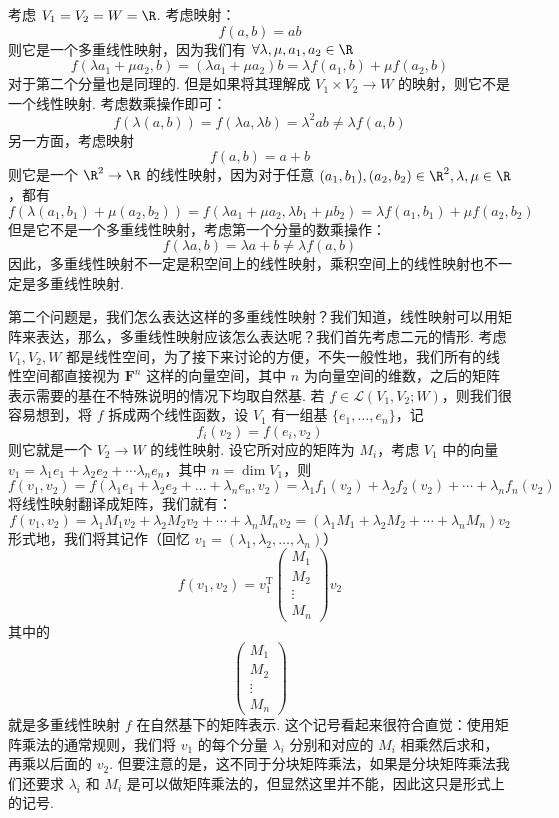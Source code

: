 \begin{example}{}{}
    考虑 $V_1 = V_2 = W = \R$. 考虑映射：
    \[
    f(a, b) = ab
    \]
    则它是一个多重线性映射，因为我们有 $\forall \lambda, \mu, a_1, a_2 \in \R$
    \[
    f(\lambda a_1 + \mu a_2, b) = (\lambda a_1 + \mu a_2) b = \lambda f(a_1, b) + \mu f(a_2, b)
    \]
    对于第二个分量也是同理的. 但是如果将其理解成 $V_1 \times V_2 \to W$ 的映射，则它不是一个线性映射. 考虑数乘操作即可：
    \[
    f(\lambda (a, b)) = f(\lambda a, \lambda b) = \lambda^2 ab \neq \lambda f(a, b)
    \]
    另一方面，考虑映射
    \[
    f(a, b) = a + b
    \]
    则它是一个 $\R^2 \to \R$ 的线性映射，因为对于任意 $(a_1, b_1), (a_2, b_2) \in \R^2, \lambda, \mu \in \R$，都有
    \[
    f(\lambda (a_1, b_1) + \mu (a_2, b_2)) = f(\lambda a_1 + \mu a_2, \lambda b_1 + \mu b_2) = \lambda f(a_1, b_1) + \mu f(a_2, b_2)
    \]
    但是它不是一个多重线性映射，考虑第一个分量的数乘操作：
    \[
    f(\lambda a, b) = \lambda a + b \neq \lambda f(a, b)
    \]
    因此，多重线性映射不一定是积空间上的线性映射，乘积空间上的线性映射也不一定是多重线性映射.
\end{example}

第二个问题是，我们怎么表达这样的多重线性映射？我们知道，线性映射可以用矩阵来表达，那么，多重线性映射应该怎么表达呢？我们首先考虑二元的情形. 考虑 $V_1, V_2, W$ 都是线性空间，为了接下来讨论的方便，不失一般性地，我们所有的线性空间都直接视为 $\mathbf{F}^n$ 这样的向量空间，其中 $n$ 为向量空间的维数，之后的矩阵表示需要的基在不特殊说明的情况下均取自然基. 若 $f \in \mathcal{L}(V_1, V_2; W)$，则我们很容易想到，将 $f$ 拆成两个线性函数，设 $V_1$ 有一组基 $\{e_1,\ldots,e_n\}$，记
\[
f_i (v_2) = f(e_i, v_2)
\]
则它就是一个 $V_2 \to W$ 的线性映射. 设它所对应的矩阵为 $M_i$，考虑 $V_1$ 中的向量 $v_1 = \lambda_1 e_1 + \lambda_2 e_2 + \cdots \lambda_n e_n$，其中 $n = \dim V_1$，则
\[
f(v_1, v_2) = f(\lambda_1 e_1 + \lambda_2 e_2 + \ldots + \lambda_n e_n, v_2) = \lambda_1 f_1 (v_2) + \lambda_2 f_2 (v_2) + \cdots + \lambda_n f_n (v_2)
\]
将线性映射翻译成矩阵，我们就有：
\[
f(v_1, v_2) = \lambda_1 M_1 v_2 + \lambda_2 M_2 v_2 + \cdots + \lambda_n M_n v_2 = (\lambda_1 M_1 + \lambda_2 M_2 + \cdots + \lambda_n M_n) v_2
\]
形式地，我们将其记作（回忆 $v_1 = (\lambda_1,\lambda_2,\ldots,\lambda_n)$）
\[
    f(v_1, v_2) = v_1^\mathrm{T} \begin{pmatrix}
        M_1 \\ M_2 \\ \vdots \\ M_n
    \end{pmatrix}
    v_2
\]
其中的
\[\begin{pmatrix}
        M_1 \\ M_2 \\ \vdots \\ M_n
    \end{pmatrix}\]
就是多重线性映射 $f$ 在自然基下的矩阵表示. 这个记号看起来很符合直觉：使用矩阵乘法的通常规则，我们将 $v_1$ 的每个分量 $\lambda_i$ 分别和对应的 $M_i$ 相乘然后求和，再乘以后面的 $v_2$. 但要注意的是，这不同于分块矩阵乘法，如果是分块矩阵乘法我们还要求 $\lambda_i$ 和 $M_i$ 是可以做矩阵乘法的，但显然这里并不能，因此这只是形式上的记号.

